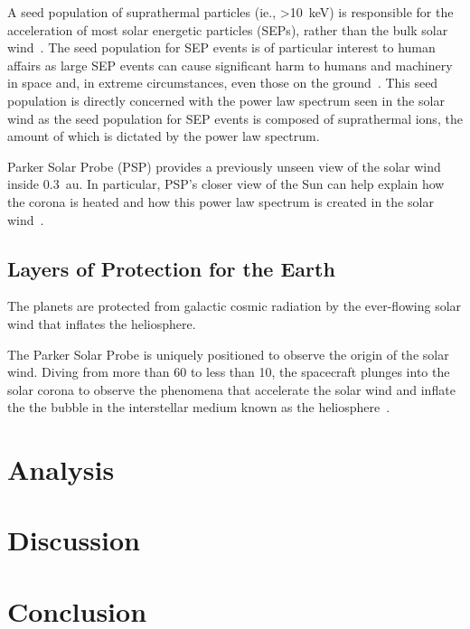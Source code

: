 \documentclass[letterpaper,11pt]{article}
\begin{document}
A seed population of suprathermal particles (ie., \SI{>10}{\kilo\electronvolt}) is responsible for the acceleration of most solar energetic particles (SEPs), rather than the bulk solar wind~\citep{Mewaldt2012}.  The seed population for SEP events is of particular interest to human affairs as large SEP events can cause significant harm to humans and machinery in space and, in extreme circumstances, even those on the ground~\citep{Desai2016}.  This seed population is directly concerned with the power law spectrum seen in the solar wind as the seed population for SEP events is composed of suprathermal ions, the amount of which is dictated by the power law spectrum.

Parker Solar Probe (PSP) provides a previously unseen view of the solar wind inside \SI{0.3}{\astronomicalunit}.  In particular, PSP's closer view of the Sun can help explain how the corona is heated and how this power law spectrum is created in the solar wind~\citep{McComas2007}.


\subsection{Layers of Protection for the Earth}
The planets are protected from galactic cosmic radiation by the ever-flowing solar wind that inflates the heliosphere.  

The Parker Solar Probe is uniquely positioned to observe the origin of the solar wind.  Diving from more than 60 to less than \SI{10}{\solarradius}, the spacecraft plunges into the solar corona to observe the phenomena that accelerate the solar wind and inflate the the bubble in the interstellar medium known as the heliosphere~\citep{McComas2014}.



\section{Analysis}
\label{sec:analysis}


\section{Discussion}
\label{sec:discussion}



\section{Conclusion}
\label{sec:conclusion}





\end{document}
